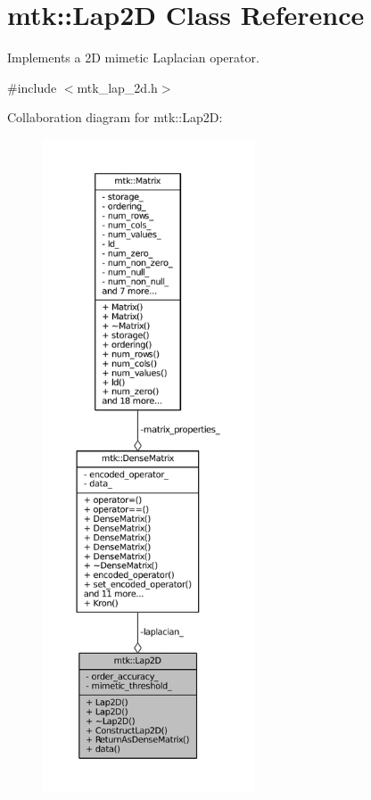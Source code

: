 \hypertarget{classmtk_1_1Lap2D}{\section{mtk\+:\+:Lap2\+D Class Reference}
\label{classmtk_1_1Lap2D}
}


Implements a 2\+D mimetic Laplacian operator.  




{\ttfamily \#include $<$mtk\+\_\+lap\+\_\+2d.\+h$>$}



Collaboration diagram for mtk\+:\+:Lap2\+D\+:
\nopagebreak
\begin{figure}[H]
\begin{center}
\leavevmode
\includegraphics[height=550pt]{classmtk_1_1Lap2D__coll__graph}
\end{center}
\end{figure}
